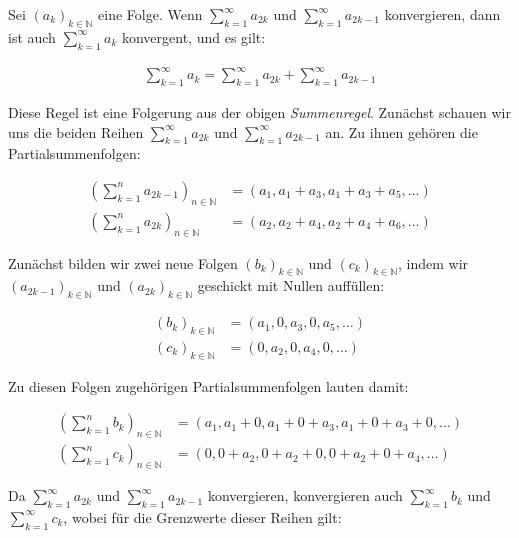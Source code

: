 \documentclass[fontsize=9pt,
               parskip=half-,
               DIV=14,
               listof=chapterentry,
               tocflat]{scrbook}
\begin{document}
\begin{theorem*}
Sei $(a_{k})_{k\in \mathbb {N} }$ eine Folge. Wenn $\sum _{k=1}^{\infty }a_{2k}$ und $\sum _{k=1}^{\infty }a_{2k-1}$ konvergieren, dann ist auch $\sum _{k=1}^{\infty }a_{k}$ konvergent, und es gilt:

\begin{align*}
\sum _{k=1}^{\infty }a_{k}=\sum _{k=1}^{\infty }a_{2k}+\sum _{k=1}^{\infty }a_{2k-1}
\end{align*}

\end{theorem*}

\begin{proof*}
Diese Regel ist eine Folgerung aus der obigen \emph{Summenregel}. Zunächst schauen wir uns die beiden Reihen $\sum _{k=1}^{\infty }a_{2k}$ und $\sum _{k=1}^{\infty }a_{2k-1}$ an. Zu ihnen gehören die Partialsummenfolgen:

\begin{align*}
\left(\sum _{k=1}^{n}a_{2k-1}\right)_{n\in \mathbb {N} }&=(a_{1},a_{1}+a_{3},a_{1}+a_{3}+a_{5},\ldots )\\[0.5em]\left(\sum _{k=1}^{n}a_{2k}\right)_{n\in \mathbb {N} }&=(a_{2},a_{2}+a_{4},a_{2}+a_{4}+a_{6},\ldots )
\end{align*}

Zunächst bilden wir zwei neue Folgen $(b_{k})_{k\in \mathbb {N} }$ und $(c_{k})_{k\in \mathbb {N} }$, indem wir $(a_{2k-1})_{k\in \mathbb {N} }$ und $(a_{2k})_{k\in \mathbb {N} }$ geschickt mit Nullen auffüllen:

\begin{align*}
(b_{k})_{k\in \mathbb {N} }&=(a_{1},0,a_{3},0,a_{5},\ldots )\\[0.5em](c_{k})_{k\in \mathbb {N} }&=(0,a_{2},0,a_{4},0,\ldots )
\end{align*}

Zu diesen Folgen zugehörigen Partialsummenfolgen lauten damit:

\begin{align*}
\left(\sum _{k=1}^{n}b_{k}\right)_{n\in \mathbb {N} }&=(a_{1},a_{1}+0,a_{1}+0+a_{3},a_{1}+0+a_{3}+0,\ldots )\\[0.5em]\left(\sum _{k=1}^{n}c_{k}\right)_{n\in \mathbb {N} }&=(0,0+a_{2},0+a_{2}+0,0+a_{2}+0+a_{4},\ldots )
\end{align*}

Da $\sum _{k=1}^{\infty }a_{2k}$ und $\sum _{k=1}^{\infty }a_{2k-1}$ konvergieren, konvergieren auch $\sum _{k=1}^{\infty }b_{k}$ und $\sum _{k=1}^{\infty }c_{k}$, wobei für die Grenzwerte dieser Reihen gilt:


\end{proof*}
\end{document}
